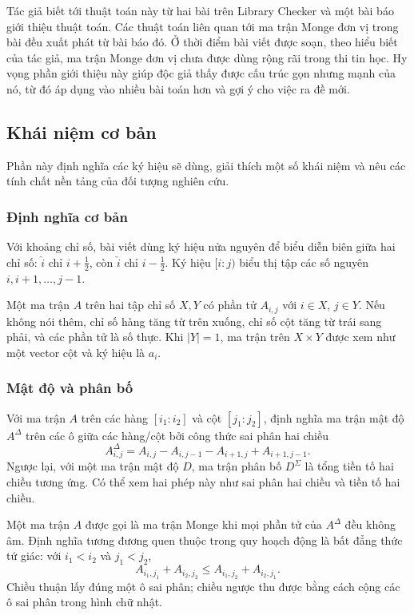 \documentclass[11pt]{article}
\begin{document}
Tác giả biết tới thuật toán này từ hai bài trên Library Checker và một bài báo
giới thiệu thuật toán. Các thuật toán liên quan tới ma trận Monge đơn vị trong
bài đều xuất phát từ bài báo đó. Ở thời điểm bài viết được soạn, theo hiểu biết
của tác giả, ma trận Monge đơn vị chưa được dùng rộng rãi trong thi tin học.
Hy vọng phần giới thiệu này giúp độc giả thấy được cấu trúc gọn nhưng mạnh của
nó, từ đó áp dụng vào nhiều bài toán hơn và gợi ý cho việc ra đề mới.

\subsection{Khái niệm cơ bản}

Phần này định nghĩa các ký hiệu sẽ dùng, giải thích một số khái niệm và nêu các
tính chất nền tảng của đối tượng nghiên cứu.

\subsubsection{Định nghĩa cơ bản}

Với khoảng chỉ số, bài viết dùng ký hiệu nửa nguyên để biểu diễn biên giữa hai
chỉ số: $\hat{i}$ chỉ $i+\frac12$, còn $\check{i}$ chỉ $i-\frac12$. Ký hiệu
$[i:j)$ biểu thị tập các số nguyên $i,i+1,\ldots,j-1$.

Một ma trận $A$ trên hai tập chỉ số $X,Y$ có phần tử $A_{i,j}$ với
$i\in X$, $j\in Y$. Nếu không nói thêm, chỉ số hàng tăng từ trên xuống, chỉ số
cột tăng từ trái sang phải, và các phần tử là số thực. Khi $|Y|=1$, ma trận
trên $X\times Y$ được xem như một vector cột và ký hiệu là $a_i$.

\subsubsection{Mật độ và phân bố}

Với ma trận $A$ trên các hàng $[i_1:i_2]$ và cột $[j_1:j_2]$, định nghĩa ma
trận mật độ $A^{\Delta}$ trên các ô giữa các hàng/cột bởi công thức sai phân hai
chiều
\[
  A^{\Delta}_{i,j}
  = A_{i,j}-A_{i,j-1}-A_{i+1,j}+A_{i+1,j-1}.
\]
Ngược lại, với một ma trận mật độ $D$, ma trận phân bố $D^\Sigma$ là tổng tiền
tố hai chiều tương ứng. Có thể xem hai phép này như sai phân hai chiều và tiền
tố hai chiều.

Một ma trận $A$ được gọi là ma trận Monge khi mọi phần tử của $A^{\Delta}$ đều
không âm. Định nghĩa tương đương quen thuộc trong quy hoạch động là bất đẳng
thức tứ giác: với $i_1<i_2$ và $j_1<j_2$,
\[
  A_{i_1,j_1}+A_{i_2,j_2}
  \le A_{i_1,j_2}+A_{i_2,j_1}.
\]
Chiều thuận lấy đúng một ô sai phân; chiều ngược thu được bằng cách cộng các ô
sai phân trong hình chữ nhật.
\end{document}
